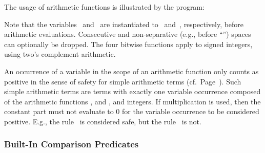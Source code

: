 \begin{example}\label{ex:arith:fun}
The usage of arithmetic functions is illustrated by the program:%
%

%
Note that the variables~ and~ are instantiated to~ and~,
respectively, before arithmetic evaluations.
Consecutive and non-separative (e.g., before ``\code{(}'')
spaces can optionally be dropped.
The four bitwise functions apply to signed integers,
using two's complement arithmetic. %
\eexample
\end{example}

\begin{Note}
An occurrence of a variable in the scope of an arithmetic function
only counts as positive in the sense of safety for simple arithmetic terms (cf.\ Page~\pageref{pg:safe}).
Such simple arithmetic terms are terms with exactly one variable occurrence
composed of the arithmetic functions \code{+}, \code{-} and \code{*}, and integers.
If multiplication is used, then the constant part must not evaluate to $0$ for the variable occurrence to be considered positive. 
E.g., the rule~
is considered safe, but
the rule~ is not.
%
\end{Note}

\subsubsection{Built-In Comparison Predicates}\label{subsec:gringo:comp}

